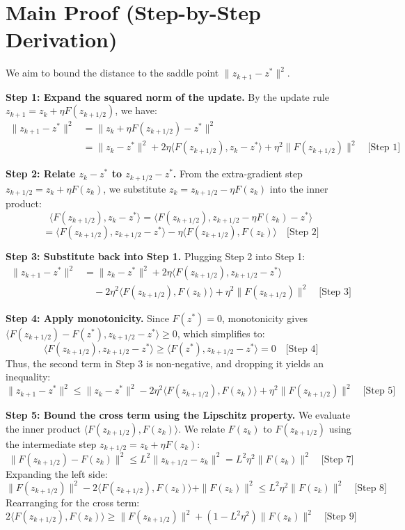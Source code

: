 \documentclass{article}
\begin{document}
\section*{Main Proof (Step-by-Step Derivation)}
We aim to bound the distance to the saddle point $\|z_{k+1} - z^*\|^2$.

\textbf{Step 1: Expand the squared norm of the update.}
By the update rule $z_{k+1} = z_k + \eta F(z_{k+1/2})$, we have:
\begin{align*}
\|z_{k+1} - z^*\|^2 &= \|z_k + \eta F(z_{k+1/2}) - z^*\|^2 \\
&= \|z_k - z^*\|^2 + 2\eta \langle F(z_{k+1/2}), z_k - z^* \rangle + \eta^2 \|F(z_{k+1/2})\|^2 \quad \text{[Step 1]}
\end{align*}

\textbf{Step 2: Relate $z_k - z^*$ to $z_{k+1/2} - z^*$.}
From the extra-gradient step $z_{k+1/2} = z_k + \eta F(z_k)$, we substitute $z_k = z_{k+1/2} - \eta F(z_k)$ into the inner product:
$$ \langle F(z_{k+1/2}), z_k - z^* \rangle = \langle F(z_{k+1/2}), z_{k+1/2} - \eta F(z_k) - z^* \rangle $$
$$ = \langle F(z_{k+1/2}), z_{k+1/2} - z^* \rangle - \eta \langle F(z_{k+1/2}), F(z_k) \rangle \quad \text{[Step 2]} $$

\textbf{Step 3: Substitute back into Step 1.}
Plugging Step 2 into Step 1:
\begin{align*}
\|z_{k+1} - z^*\|^2 &= \|z_k - z^*\|^2 + 2\eta \langle F(z_{k+1/2}), z_{k+1/2} - z^* \rangle \\
&\quad - 2\eta^2 \langle F(z_{k+1/2}), F(z_k) \rangle + \eta^2 \|F(z_{k+1/2})\|^2 \quad \text{[Step 3]}
\end{align*}

\textbf{Step 4: Apply monotonicity.}
Since $F(z^*) = 0$, monotonicity gives $\langle F(z_{k+1/2}) - F(z^*), z_{k+1/2} - z^* \rangle \geq 0$, which simplifies to:
$$ \langle F(z_{k+1/2}), z_{k+1/2} - z^* \rangle \geq \langle F(z^*), z_{k+1/2} - z^* \rangle = 0 \quad \text{[Step 4]} $$
Thus, the second term in Step 3 is non-negative, and dropping it yields an inequality:
$$ \|z_{k+1} - z^*\|^2 \leq \|z_k - z^*\|^2 - 2\eta^2 \langle F(z_{k+1/2}), F(z_k) \rangle + \eta^2 \|F(z_{k+1/2})\|^2 \quad \text{[Step 5]} $$

\textbf{Step 5: Bound the cross term using the Lipschitz property.}
We evaluate the inner product $\langle F(z_{k+1/2}), F(z_k) \rangle$. We relate $F(z_k)$ to $F(z_{k+1/2})$ using the intermediate step $z_{k+1/2} = z_k + \eta F(z_k)$:
$$ \|F(z_{k+1/2}) - F(z_k)\|^2 \leq L^2 \|z_{k+1/2} - z_k\|^2 = L^2 \eta^2 \|F(z_k)\|^2 \quad \text{[Step 7]} $$
Expanding the left side:
$$ \|F(z_{k+1/2})\|^2 - 2\langle F(z_{k+1/2}), F(z_k) \rangle + \|F(z_k)\|^2 \leq L^2 \eta^2 \|F(z_k)\|^2 \quad \text{[Step 8]} $$
Rearranging for the cross term:
$$ 2\langle F(z_{k+1/2}), F(z_k) \rangle \geq \|F(z_{k+1/2})\|^2 + (1 - L^2 \eta^2) \|F(z_k)\|^2 \quad \text{[Step 9]} $$
\end{document}
